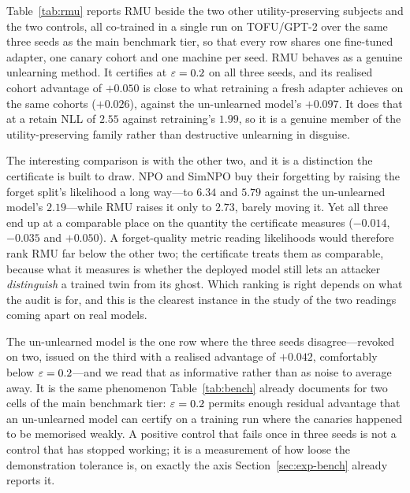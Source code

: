 Table~\ref{tab:rmu} reports RMU beside the two other utility-preserving subjects and
the two controls, all co-trained in a single run on TOFU/GPT-2 over the same three
seeds as the main benchmark tier, so that every row shares one fine-tuned adapter, one
canary cohort and one machine per seed. RMU behaves as a genuine unlearning method.
It certifies at $\varepsilon = 0.2$ on all three seeds, and its realised cohort advantage of
$+0.050$ is close to what retraining a fresh adapter achieves on the same cohorts
($+0.026$), against the un-unlearned model's $+0.097$. It does that at a retain NLL of
$2.55$ against retraining's $1.99$, so it is a genuine member of the
utility-preserving family rather than destructive unlearning in disguise.

The interesting comparison is with the other two, and it is a distinction the
certificate is built to draw. NPO and SimNPO buy their forgetting by raising the
forget split's likelihood a long way---to $6.34$ and $5.79$ against the un-unlearned
model's $2.19$---while RMU raises it only to $2.73$, barely moving it. Yet all three
end up at a comparable place on the quantity the certificate measures ($-0.014$,
$-0.035$ and $+0.050$). A forget-quality metric reading likelihoods would
therefore rank RMU far below the other two; the certificate treats them as
comparable, because what it measures is whether the deployed model still lets an
attacker \emph{distinguish} a trained twin from its ghost. Which ranking is right
depends on what the audit is for, and this is the clearest instance in the study of
the two readings coming apart on real models.

The un-unlearned model is the one row where the three seeds disagree---revoked on two,
issued on the third with a realised advantage of $+0.042$, comfortably below
$\varepsilon = 0.2$---and we read that as informative rather than as noise to average away.
It is the same phenomenon Table~\ref{tab:bench} already documents for two cells of the
main benchmark tier: $\varepsilon = 0.2$ permits enough residual advantage that an
un-unlearned model can certify on a training run where the canaries happened to be
memorised weakly. A positive control that fails once in three seeds is not a control
that has stopped working; it is a measurement of how loose the demonstration
tolerance is, on exactly the axis Section~\ref{sec:exp-bench} already reports it.

\begin{table}[t]
\centering\small
\caption{Representation misdirection (RMU) beside the other utility-preserving
subjects, co-trained on TOFU/GPT-2 with a shared fine-tuned adapter, $384$ pairs,
cohort target. Verdicts are per seed (\vI\ issued, \vR\ revoked, \vU\ undetermined);
$\hat\Delta$ is the realised cohort advantage of $s_{\mathrm{loss}}$; forget and
retain NLL are on the benchmark's own splits. It uses the same protocol, cohort size,
tolerances and seed count as the benchmark tier of Section~\ref{sec:exp-bench}, and is
reported as its own tier because its subjects were co-trained in a single run.}
\label{tab:rmu}

\end{table}

